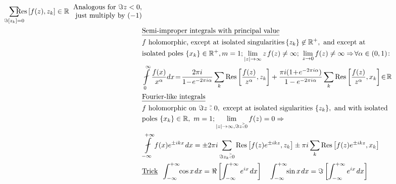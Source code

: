 \begin{align*}
    \sum_{\Im \left[z_k\right] = 0}\!\!\! \!\!\!\!\!\operatorname{Res}\left[f(z), z_k\right]\in \mathbb{R}\; \; 
    \begin{matrix}
        \text{Analogous for } \Im z <0, \\\text{ just multiply by $(-1)$} 
    \end{matrix}\\
    &\underline{\text{Semi-improper integrals with principal value}}\\
    &f \text{ holomorphic, except at isolated singularities } \!
    \{z_k\}\not\in \mathbb{R}^+,  \ \text{and except at}\\
    &\text{isolated poles } \{x_k\}  \in  \mathbb{R}^+ , m = 1;  \lim_{|z|\rightarrow \infty} z\! \; f(z) \not = \infty ; \ \lim_{z\rightarrow 0} f(z) \not = \infty\Rightarrow \! \forall \alpha \in (0,1)\!:\\
    &\fint\limits_{0}^{\infty} \frac{f(x)}{x^{\alpha}} dx\! =\! \frac{2\pi i }{1\!-\!e^{-2\pi i \alpha }}\sum_{k}\operatorname{Res}\left[\frac{f(z)}{z^{\alpha}}, z_k\right]+ \frac{\pi i (1\!+\!e^{-2\pi i \alpha })}{1-e^{-2\pi i \alpha}}\sum_{k}\operatorname{Res}\left[\frac{f(z)}{z^{\alpha}}, x_k\right]\!\in\! \mathbb{R}\\
    &\underline{\text{Fourier-like integrals}}\\
    &f\text{ holomorphic on }\Im z \stackrel{\scalebox{0.5}{$>$}}{\scalebox{0.5}{$<$}} 0, \text{ except at isolated sigularities } \{z_k\}, \text{ and with isolated}\\
    &\text{poles } \{x_k\}\in \mathbb{R}, \ m=1; \lim_{|z|\rightarrow\infty, \Im z \stackrel{\scalebox{0.5}{$>$}}{\scalebox{0.5}{$<$}} 0} f(z) =0 \Rightarrow\\
    &\fint\limits_{-\infty}^{+\infty}f(x)e^{\pm ikx} \;\! dx=\pm 2\pi i \sum_{\Im z_k \stackrel{\scalebox{0.5}{$>$}}{\scalebox{0.5}{$<$}} 0} \operatorname{Res}\left[f(z)e^{\pm ikz}, z_k\right] \pm \pi i \sum_k \operatorname{Res}\left[f(z)e^{\pm ikz}, x_k\right] \\
     &\underline{\text{Trick}}\;\;  \int_{-\infty}^{+\infty}\!\! \cos x \; \!dx = \Re \left[\int_{-\infty}^{+\infty} e^{ix}\!\; dx\right] \;\;\;\;\int_{-\infty}^{+\infty}\!\! \sin x \; \!dx = \Im \left[\int_{-\infty}^{+\infty} e^{ix} \!\; dx\right]
\end{align*}